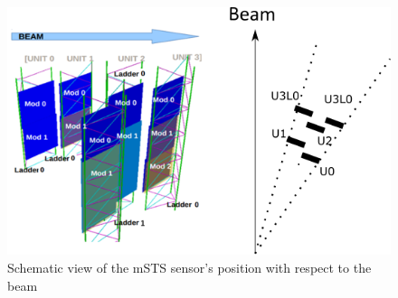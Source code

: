\begin{figure}[!h]
\centering
\includegraphics[width=0.75\columnwidth]{Chapter6/DCS/images/msts_sensors_scheme2.png}
\caption{Schematic view of the \gls{mSTS} sensor's position with respect to the beam}
\label{fig_sensors_scheme}
\end{figure}
\newpage
